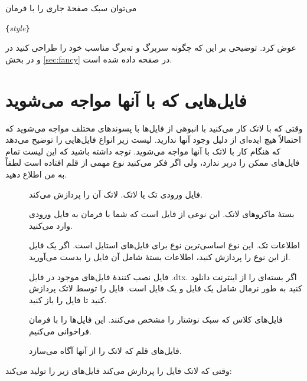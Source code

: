 {می‌توان سبک‌ صفحهٔ جاری را با فرمان 
\begin{lscommand}
\verb|{|\emph{style}\verb|}|
\end{lscommand}
عوض کرد. توضیحی بر این که چگونه سربرگ و ته‌برگ مناسب خود را طراحی کنید در \companion{} و در بخش 
\ref{sec:fancy}
 در صفحه 
\pageref{sec:fancy} داده شده است.
%
%
\pagebreak
\section{فایل‌هایی که با آنها مواجه می‌شوید}

وقتی که با لاتک کار می‌کنید با انبوهی از فایل‌ها با پسوندهای
%
مختلف مواجه می‌شوید که احتمالاً هیچ ایده‌ای از دلیل وجود آنها ندارید. لیست زیر %
انواع فایل‌هایی را توضیح می‌دهد که هنگام کار با لاتک با آنها مواجه می‌شوید. توجه داشته باشید که این لیست تمام فایل‌های ممکن را دربر ندارد، ولی اگر فکر می‌کنید نوع مهمی از قلم افتاده است لطفاً به من اطلاع دهید.

\begin{description}
  
\item[] فایل ورودی تک یا لاتک. لاتک آن را پردازش می‌کند.

\item[] بستهٔ ماکروهای لاتک. این نوعی از فایل است که شما با فرمان  به فایل ورودی وارد می‌کنید.

\item[] اطلاعات تک. این نوع اساسی‌ترین نوع برای فایل‌های استایل است. اگر یک فایل از این نوع را پردازش کنید، اطلاعات بستهٔ شامل آن فایل را بدست می‌آورید.

\item[] فایل نصب کنندهٔ فایل‌های موجود در فایل \textrm{.dtx}. اگر بسته‌ای را از اینترنت دانلود کنید به طور نرمال شامل یک فایل  و یک فایل 
 است. فایل  را توسط لاتک پردازش کنید تا فایل  را باز کنید.
\item[] فایل‌های کلاس که سبک نوشتار را مشخص می‌کنند. این فایل‌ها را با فرمان  فراخوانی می‌کنیم.
\item[] فایل‌های قلم که لاتک را از آنها آگاه می‌سازد.
\end{description}
وقتی که لاتک فایل را پردازش می‌کند فایل‌های زیر را تولید می‌کند:

}
